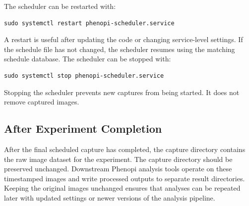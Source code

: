The scheduler can be restarted with:

\begin{verbatim}
sudo systemctl restart phenopi-scheduler.service
\end{verbatim}

A restart is useful after updating the code or changing service-level settings.
If the schedule file has not changed, the scheduler resumes using the matching
schedule database. The scheduler can be stopped with:

\begin{verbatim}
sudo systemctl stop phenopi-scheduler.service
\end{verbatim}

Stopping the scheduler prevents new captures from being started. It does not
remove captured images.

\subsection{After Experiment Completion}

After the final scheduled capture has completed, the capture directory contains
the raw image dataset for the experiment. The capture directory should be
preserved unchanged. Downstream Phenopi analysis tools operate on these
timestamped images and write processed outputs to separate result directories.
Keeping the original images unchanged ensures that analyses can be repeated
later with updated settings or newer versions of the analysis pipeline.
